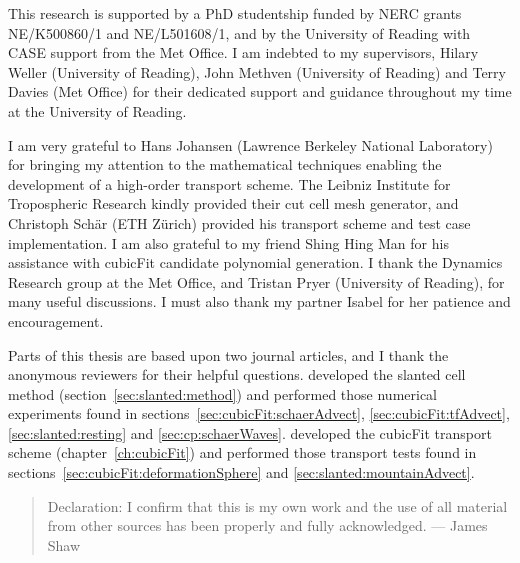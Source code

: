\null\vfil
\begin{acknowledgements}
This research is supported by a PhD studentship funded by NERC grants NE/K500860/1 and NE/L501608/1, and by the University of Reading with CASE support from the Met Office.  I am indebted to my supervisors, Hilary Weller (University of Reading), John Methven (University of Reading) and Terry Davies (Met Office) for their dedicated support and guidance throughout my time at the University of Reading.

I am very grateful to Hans Johansen (Lawrence Berkeley National Laboratory) for bringing my attention to the mathematical techniques enabling the development of a high-order transport scheme.  The Leibniz Institute for Tropospheric Research kindly provided their cut cell mesh generator, and Christoph Sch\"{a}r (ETH Z\"{u}rich) provided his transport scheme and test case implementation.
I am also grateful to my friend Shing Hing Man for his assistance with cubicFit candidate polynomial generation.  I thank the Dynamics Research group at the Met Office, and Tristan Pryer (University of Reading), for many useful discussions.
I must also thank my partner Isabel for her patience and encouragement.
	
Parts of this thesis are based upon two journal articles, and I thank the anonymous reviewers for their helpful questions. \citet{shaw-weller2016} developed the slanted cell method (section~\ref{sec:slanted:method}) and performed those numerical experiments found in sections~\ref{sec:cubicFit:schaerAdvect}, \ref{sec:cubicFit:tfAdvect}, \ref{sec:slanted:resting} and \ref{sec:cp:schaerWaves}.
\citet{shaw2017} developed the cubicFit transport scheme (chapter~\ref{ch:cubicFit}) and performed those transport tests found in sections~\ref{sec:cubicFit:deformationSphere} and \ref{sec:slanted:mountainAdvect}.

\vspace*{4em}


\end{acknowledgements}
\vfil
\begin{quote}{\small Declaration: I confirm that this is my own work and the use of all material from other sources has been properly and fully acknowledged. --- James Shaw}
\end{quote}

